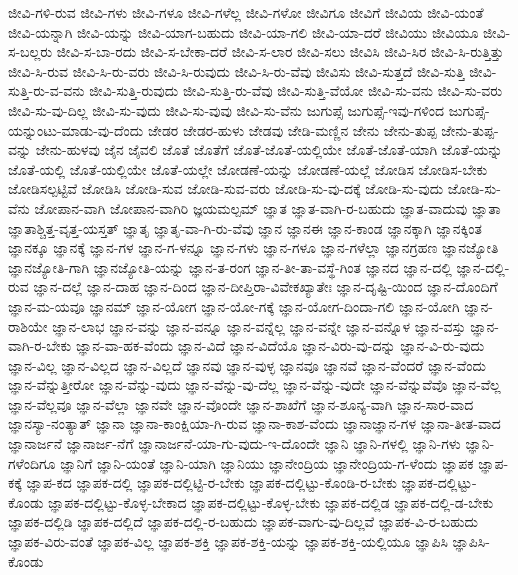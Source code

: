 {ಜೀವಿ-ಗಳಿ-ರುವ
ಜೀವಿ-ಗಳು
ಜೀವಿ-ಗಳೂ
ಜೀವಿ-ಗಳೆಲ್ಲ
ಜೀವಿ-ಗಳೋ
ಜೀವಿಗೂ
ಜೀವಿಗೆ
ಜೀವಿಯ
ಜೀವಿ-ಯಂತೆ
ಜೀವಿ-ಯನ್ನಾಗಿ
ಜೀವಿ-ಯನ್ನು
ಜೀವಿ-ಯಾಗ-ಬಹುದು
ಜೀವಿ-ಯಾ-ಗಲಿ
ಜೀವಿ-ಯಾ-ದರೆ
ಜೀವಿಯು
ಜೀವಿಯೂ
ಜೀವಿ-ಸ-ಬಲ್ಲರು
ಜೀವಿ-ಸ-ಬಾ-ರದು
ಜೀವಿ-ಸ-ಬೇಕಾ-ದರೆ
ಜೀವಿ-ಸ-ಲಾರ
ಜೀವಿ-ಸಲು
ಜೀವಿಸಿ
ಜೀವಿ-ಸಿರ
ಜೀವಿ-ಸಿ-ರುತ್ತಿತ್ತು
ಜೀವಿ-ಸಿ-ರುವ
ಜೀವಿ-ಸಿ-ರು-ವರು
ಜೀವಿ-ಸಿ-ರುವುದು
ಜೀವಿ-ಸಿ-ರು-ವೆವು
ಜೀವಿಸು
ಜೀವಿ-ಸುತ್ತದೆ
ಜೀವಿ-ಸುತ್ತಿ
ಜೀವಿ-ಸುತ್ತಿ-ರು-ವ-ವನು
ಜೀವಿ-ಸುತ್ತಿ-ರುವುದು
ಜೀವಿ-ಸುತ್ತಿ-ರು-ವೆವು
ಜೀವಿ-ಸುತ್ತಿ-ವೆಯೋ
ಜೀವಿ-ಸು-ವನು
ಜೀವಿ-ಸು-ವರು
ಜೀವಿ-ಸು-ವು-ದಿಲ್ಲ
ಜೀವಿ-ಸು-ವುದು
ಜೀವಿ-ಸು-ವುವು
ಜೀವಿ-ಸು-ವೆನು
ಜುಗುಪ್ಸೆ
ಜುಗುಪ್ಸೆ-ಇವು-ಗಳಿಂದ
ಜುಗುಪ್ಸೆ-ಯನ್ನುಂಟು-ಮಾಡು-ವು-ದೆಂದು
ಜೇಡರ
ಜೇಡರ-ಹುಳು
ಜೇಡವು
ಜೇಡಿ-ಮಣ್ಣಿನ
ಜೇನು
ಜೇನು-ತುಪ್ಪ
ಜೇನು-ತುಪ್ಪ-ವನ್ನು
ಜೇನು-ಹುಳವು
ಜೈನ
ಜೈವಲಿ
ಜೊತೆ
ಜೊತೆಗೆ
ಜೊತೆ-ಜೊತೆ-ಯಲ್ಲಿಯೇ
ಜೊತೆ-ಜೊತೆ-ಯಾಗಿ
ಜೊತೆ-ಯನ್ನು
ಜೊತೆ-ಯಲ್ಲಿ
ಜೊತೆ-ಯಲ್ಲಿಯೇ
ಜೊತೆ-ಯಲ್ಲೇ
ಜೋಡಣೆ-ಯನ್ನು
ಜೋಡಣೆ-ಯಲ್ಲೆ
ಜೋಡಿಸ
ಜೋಡಿಸ-ಬೇಕು
ಜೋಡಿಸಲ್ಪಟ್ಟಿವೆ
ಜೋಡಿಸಿ
ಜೋಡಿ-ಸುವ
ಜೋಡಿ-ಸುವ-ವರು
ಜೋಡಿ-ಸು-ವು-ದಕ್ಕೆ
ಜೋಡಿ-ಸು-ವುದು
ಜೋಡಿ-ಸು-ವೆನು
ಜೋಪಾನ-ವಾಗಿ
ಜೋಪಾನ-ವಾಗಿರಿ
ಜ್ಞಯಮಲ್ಪಮ್
ಜ್ಞಾತ
ಜ್ಞಾತ-ವಾಗಿ-ರ-ಬಹುದು
ಜ್ಞಾತ-ವಾದುವು
ಜ್ಞಾತಾ
ಜ್ಞಾತಾಶ್ಚಿತ್ತ-ವೃತ್ತ-ಯಸ್ತತ್
ಜ್ಞಾತೃ
ಜ್ಞಾತೃ-ವಾ-ಗಿ-ರು-ವೆವು
ಜ್ಞಾನ
ಜ್ಞಾನಈ
ಜ್ಞಾನ-ಕಾಂಡ
ಜ್ಞಾನಕ್ಕಾಗಿ
ಜ್ಞಾನಕ್ಕಿಂತ
ಜ್ಞಾನಕ್ಕೂ
ಜ್ಞಾನಕ್ಕೆ
ಜ್ಞಾನ-ಗಳ
ಜ್ಞಾನ-ಗ-ಳನ್ನೂ
ಜ್ಞಾನ-ಗಳು
ಜ್ಞಾನ-ಗಳೂ
ಜ್ಞಾನ-ಗಳೆಲ್ಲಾ
ಜ್ಞಾನಗ್ರಹಣ
ಜ್ಞಾನಜ್ಯೋತಿ
ಜ್ಞಾನಜ್ಯೋತಿ-ಗಾಗಿ
ಜ್ಞಾನಜ್ಯೋತಿ-ಯನ್ನು
ಜ್ಞಾನ-ತ-ರಂಗ
ಜ್ಞಾನ-ತೀ-ತಾ-ವಸ್ಥೆ-ಗಿಂತ
ಜ್ಞಾನದ
ಜ್ಞಾನ-ದಲ್ಲಿ
ಜ್ಞಾನ-ದಲ್ಲಿ-ರುವ
ಜ್ಞಾನ-ದಲ್ಲೆ
ಜ್ಞಾನ-ದಾಹ
ಜ್ಞಾನ-ದಿಂದ
ಜ್ಞಾನ-ದೀಪ್ತಿರಾ-ವಿವೇಕಖ್ಯಾತೇಃ
ಜ್ಞಾನ-ದೃಷ್ಟಿ-ಯಿಂದ
ಜ್ಞಾನ-ದೊಂದಿಗೆ
ಜ್ಞಾನ-ಮ-ಯವೂ
ಜ್ಞಾನಮ್
ಜ್ಞಾನ-ಯೋಗ
ಜ್ಞಾನ-ಯೋ-ಗಕ್ಕೆ
ಜ್ಞಾನ-ಯೋಗ-ದಿಂದಾ-ಗಲಿ
ಜ್ಞಾನ-ಯೋಗಿ
ಜ್ಞಾನ-ರಾಶಿಯೇ
ಜ್ಞಾನ-ಲಾಭ
ಜ್ಞಾನ-ವನ್ನು
ಜ್ಞಾನ-ವನ್ನೂ
ಜ್ಞಾನ-ವನ್ನೆಲ್ಲ
ಜ್ಞಾನ-ವನ್ನೇ
ಜ್ಞಾನ-ವನ್ನೊಳ
ಜ್ಞಾನ-ವಸ್ತು
ಜ್ಞಾನ-ವಾಗಿ-ರ-ಬೇಕು
ಜ್ಞಾನ-ವಾ-ಹಕ-ವೆಂದು
ಜ್ಞಾನ-ವಿದೆ
ಜ್ಞಾನ-ವಿದೆಯೊ
ಜ್ಞಾನ-ವಿರು-ವು-ದನ್ನು
ಜ್ಞಾನ-ವಿ-ರು-ವುದು
ಜ್ಞಾನ-ವಿಲ್ಲ
ಜ್ಞಾನ-ವಿಲ್ಲದ
ಜ್ಞಾನ-ವಿಲ್ಲದೆ
ಜ್ಞಾನವು
ಜ್ಞಾನ-ವುಳ್ಳ
ಜ್ಞಾನವೂ
ಜ್ಞಾನವೆ
ಜ್ಞಾನ-ವೆಂದರೆ
ಜ್ಞಾನ-ವೆಂದು
ಜ್ಞಾನ-ವೆನ್ನುತ್ತೀರೋ
ಜ್ಞಾನ-ವೆನ್ನು-ವುದು
ಜ್ಞಾನ-ವೆನ್ನು-ವು-ದೆಲ್ಲ
ಜ್ಞಾನ-ವೆನ್ನು-ವುದೇ
ಜ್ಞಾನ-ವೆನ್ನುವೆವೊ
ಜ್ಞಾನ-ವೆಲ್ಲ
ಜ್ಞಾನ-ವೆಲ್ಲವೂ
ಜ್ಞಾನ-ವೆಲ್ಲಾ
ಜ್ಞಾನವೇ
ಜ್ಞಾನ-ವೊಂದೇ
ಜ್ಞಾನ-ಶಾಖೆಗೆ
ಜ್ಞಾನ-ಶೂನ್ಯ-ವಾಗಿ
ಜ್ಞಾನ-ಸಾರ-ವಾದ
ಜ್ಞಾನಸ್ಯಾ-ನಂತ್ಯಾತ್
ಜ್ಞಾನಾ
ಜ್ಞಾನಾ-ಕಾಂಕ್ಷಿಯಾ-ಗಿ-ರುವ
ಜ್ಞಾನಾ-ಕಾಶ-ವೆಂದು
ಜ್ಞಾನಾಜ್ಞಾನ-ಗಳ
ಜ್ಞಾನಾ-ತೀತ-ವಾದ
ಜ್ಞಾನಾರ್ಜನೆ
ಜ್ಞಾನಾರ್ಜ-ನೆಗೆ
ಜ್ಞಾನಾರ್ಜನೆ-ಯಾ-ಗು-ವುದು-ಇ-ದೊಂದೇ
ಜ್ಞಾನಿ
ಜ್ಞಾನಿ-ಗಳಲ್ಲಿ
ಜ್ಞಾನಿ-ಗಳು
ಜ್ಞಾನಿ-ಗಳೆಂದಿಗೂ
ಜ್ಞಾನಿಗೆ
ಜ್ಞಾನಿ-ಯಂತೆ
ಜ್ಞಾನಿ-ಯಾಗಿ
ಜ್ಞಾನಿಯು
ಜ್ಞಾನೇಂದ್ರಿಯ
ಜ್ಞಾನೇಂದ್ರಿಯ-ಗ-ಳೆಂದು
ಜ್ಞಾಪಕ
ಜ್ಞಾಪ-ಕಕ್ಕೆ
ಜ್ಞಾಪ-ಕದ
ಜ್ಞಾಪಕ-ದಲ್ಲಿ
ಜ್ಞಾಪಕ-ದಲ್ಲಿಟ್ಟಿ-ರ-ಬೇಕು
ಜ್ಞಾಪಕ-ದಲ್ಲಿಟ್ಟು-ಕೊಂಡಿ-ರ-ಬೇಕು
ಜ್ಞಾಪಕ-ದಲ್ಲಿಟ್ಟು-ಕೊಂಡು
ಜ್ಞಾಪಕ-ದಲ್ಲಿಟ್ಟು-ಕೊಳ್ಳ-ಬೇಕಾದ
ಜ್ಞಾಪಕ-ದಲ್ಲಿಟ್ಟು-ಕೊಳ್ಳ-ಬೇಕು
ಜ್ಞಾಪಕ-ದಲ್ಲಿಡ
ಜ್ಞಾಪಕ-ದಲ್ಲಿ-ಡ-ಬೇಕು
ಜ್ಞಾಪಕ-ದಲ್ಲಿಡಿ
ಜ್ಞಾಪಕ-ದಲ್ಲಿದೆ
ಜ್ಞಾಪಕ-ದಲ್ಲಿ-ರ-ಬಹುದು
ಜ್ಞಾಪಕ-ವಾಗು-ವು-ದಿಲ್ಲವೆ
ಜ್ಞಾಪಕ-ವಿ-ರ-ಬಹುದು
ಜ್ಞಾಪಕ-ವಿರು-ವಂತೆ
ಜ್ಞಾಪಕ-ವಿಲ್ಲ
ಜ್ಞಾಪಕ-ಶಕ್ತಿ
ಜ್ಞಾಪಕ-ಶಕ್ತಿ-ಯನ್ನು
ಜ್ಞಾಪಕ-ಶಕ್ತಿ-ಯಲ್ಲಿಯೂ
ಜ್ಞಾಪಿಸಿ
ಜ್ಞಾಪಿಸಿ-ಕೊಂಡು
}
